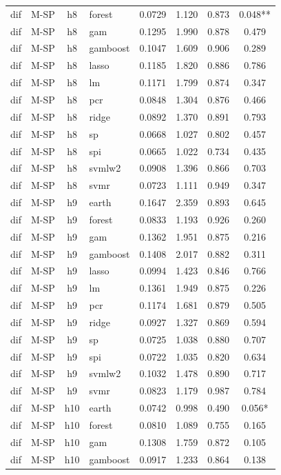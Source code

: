\begin{ThreePartTable}
\begin{longtable}[t]{llclcccc}
dif & M-SP & h8 & forest & 0.0729 & 1.120 & 0.873 & 0.048**\\
dif & M-SP & h8 & gam & 0.1295 & 1.990 & 0.878 & 0.479\\
dif & M-SP & h8 & gamboost & 0.1047 & 1.609 & 0.906 & 0.289\\
dif & M-SP & h8 & lasso & 0.1185 & 1.820 & 0.886 & 0.786\\
dif & M-SP & h8 & lm & 0.1171 & 1.799 & 0.874 & 0.347\\
dif & M-SP & h8 & pcr & 0.0848 & 1.304 & 0.876 & 0.466\\
dif & M-SP & h8 & ridge & 0.0892 & 1.370 & 0.891 & 0.793\\
dif & M-SP & h8 & sp & 0.0668 & 1.027 & 0.802 & 0.457\\
dif & M-SP & h8 & spi & 0.0665 & 1.022 & 0.734 & 0.435\\
dif & M-SP & h8 & svmlw2 & 0.0908 & 1.396 & 0.866 & 0.703\\
dif & M-SP & h8 & svmr & 0.0723 & 1.111 & 0.949 & 0.347\\
\addlinespace
dif & M-SP & h9 & earth & 0.1647 & 2.359 & 0.893 & 0.645\\
dif & M-SP & h9 & forest & 0.0833 & 1.193 & 0.926 & 0.260\\
dif & M-SP & h9 & gam & 0.1362 & 1.951 & 0.875 & 0.216\\
dif & M-SP & h9 & gamboost & 0.1408 & 2.017 & 0.882 & 0.311\\
dif & M-SP & h9 & lasso & 0.0994 & 1.423 & 0.846 & 0.766\\
dif & M-SP & h9 & lm & 0.1361 & 1.949 & 0.875 & 0.226\\
dif & M-SP & h9 & pcr & 0.1174 & 1.681 & 0.879 & 0.505\\
dif & M-SP & h9 & ridge & 0.0927 & 1.327 & 0.869 & 0.594\\
dif & M-SP & h9 & sp & 0.0725 & 1.038 & 0.880 & 0.707\\
dif & M-SP & h9 & spi & 0.0722 & 1.035 & 0.820 & 0.634\\
dif & M-SP & h9 & svmlw2 & 0.1032 & 1.478 & 0.890 & 0.717\\
dif & M-SP & h9 & svmr & 0.0823 & 1.179 & 0.987 & 0.784\\
\addlinespace
dif & M-SP & h10 & earth & 0.0742 & 0.998 & 0.490 & 0.056*\\
dif & M-SP & h10 & forest & 0.0810 & 1.089 & 0.755 & 0.165\\
dif & M-SP & h10 & gam & 0.1308 & 1.759 & 0.872 & 0.105\\
dif & M-SP & h10 & gamboost & 0.0917 & 1.233 & 0.864 & 0.138\\

\end{longtable}
\end{ThreePartTable}
